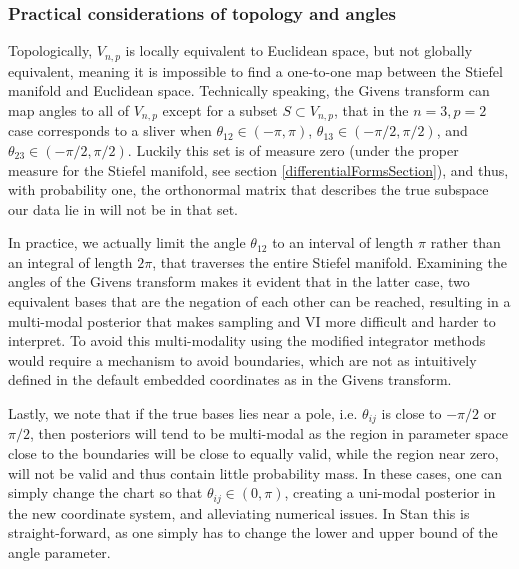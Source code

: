 \documentclass{article}
\begin{document}
\subsubsection{Practical considerations of topology and angles}
Topologically, $V_{n,p}$ is locally equivalent to Euclidean space, but not globally equivalent, meaning it is impossible to find a one-to-one map between the Stiefel manifold and Euclidean space. Technically speaking, the Givens transform can map angles to all of $V_{n,p}$ except for a subset $S \subset V_{n,p}$, that in the $n=3, p=2$ case corresponds to a sliver when $\theta_{12} \in (-\pi, \pi)$, $\theta_{13} \in (-\pi/2, \pi/2)$, and $\theta_{23} \in (-\pi/2, \pi/2)$. Luckily this set is of measure zero (under the proper measure for the Stiefel manifold, see section \ref{differentialFormsSection}), and thus, with probability one, the orthonormal matrix that describes the true subspace our data lie in will not be in that set. 

In practice, we actually limit the angle $\theta_{12}$ to an interval of length $\pi$ rather than an integral of length $2\pi$, that traverses the entire Stiefel manifold. Examining the angles of the Givens transform makes it evident that in the latter case, two equivalent bases that are the negation of each other can be reached, resulting in a multi-modal posterior that makes sampling and VI more difficult and harder to interpret. To avoid this multi-modality using the modified integrator methods would require a mechanism to avoid boundaries, which are not as intuitively defined in the default embedded coordinates as in the Givens transform.

Lastly, we note that if the true bases lies near a pole, i.e. $\theta_{ij}$ is close to $-\pi/2$ or $\pi/2$, then posteriors will tend to be multi-modal as the region in parameter space close to the boundaries will be close to equally valid, while the region near zero, will not be valid and thus contain little probability mass. In these cases, one can simply change the chart so that $\theta_{ij} \in (0, \pi)$, creating a uni-modal posterior in the new coordinate system, and alleviating numerical issues. In Stan this is straight-forward, as one simply has to change the lower and upper bound of the angle parameter.

\end{document}
